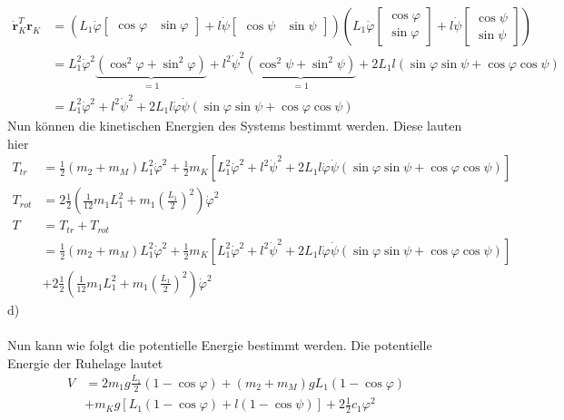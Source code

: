 \begin{align*}
	\dot{\textbf{r}}_K^T\textbf{r}_K &= \left(L_1\dot{\varphi}\left[\begin{matrix}
		\cos\varphi &
		\sin\varphi
		\end{matrix}\right]
	+
	l\dot{\psi}\left[\begin{matrix}
	\cos\psi &
	\sin\psi
	\end{matrix}\right]\right)
	\left(L_1\dot{\varphi}\left[\begin{matrix}
		\cos\varphi \\
		\sin\varphi
		\end{matrix}\right]
	+
	l\dot{\psi}\left[\begin{matrix}
	\cos\psi\\
	\sin\psi
	\end{matrix}\right]\right) \\
	&= L_1^2\dot{\varphi}^2\underbrace{\left(\cos^2\varphi + \sin^2\varphi\right)}_{=1} + l^2\dot{\psi}^2\underbrace{\left( \cos^2\psi + \sin^2\psi\right)}_{=1} + 2L_1l\left(\sin\varphi\sin\psi + \cos\varphi\cos\psi\right) \\
	&= L_1^2\dot{\varphi}^2 + l^2\dot{\psi}^2 + 2L_1l\dot{\varphi}\dot{\psi}\left(\sin\varphi\sin\psi + \cos\varphi\cos\psi\right)
\end{align*}
Nun können die kinetischen Energien des Systems bestimmt werden. Diese lauten hier
\begin{align*}
	T_{tr} &= \frac{1}{2} \left(m_2 + m_M\right) L_1^2\dot{\varphi}^2 + \frac{1}{2} m_K \left[ L_1^2\dot{\varphi}^2 + l^2\dot{\psi}^2 + 2L_1l\dot{\varphi}\dot{\psi}\left(\sin\varphi\sin\psi + \cos\varphi\cos\psi\right)\right] \\
	T_{rot} &= 2 \frac{1}{2} \left(\frac{1}{12}m_1L_1^2 + m_1\left(\frac{L_1}{2}\right)^2\right)\dot{\varphi}^2 \\
	T &= T_{tr} + T_{rot} \\
	  &= \frac{1}{2} \left(m_2 + m_M\right) L_1^2\dot{\varphi}^2 + \frac{1}{2} m_K \left[ L_1^2\dot{\varphi}^2 + l^2\dot{\psi}^2 + 2L_1l\dot{\varphi}\dot{\psi}\left(\sin\varphi\sin\psi + \cos\varphi\cos\psi\right)\right] \\
	  &+ 2\frac{1}{2} \left(\frac{1}{12}m_1L_1^2 + m_1\left(\frac{L_1}{2}\right)^2\right)\dot{\varphi}^2
\end{align*}
d) \\ \\
Nun kann wie folgt die potentielle Energie bestimmt werden. Die potentielle Energie der Ruhelage lautet
\begin{align*}
	V &= 2m_1g\frac{L_1}{2}\left(1-\cos\varphi\right) + \left(m_2 + m_M\right)gL_1 \left(1 - \cos\varphi\right) \\
	&+ m_Kg\left[L_1\left(1-\cos\varphi\right) +l\left(1 - \cos\psi\right)\right] + 2 \frac{1}{2}c_1\varphi^2
\end{align*}
